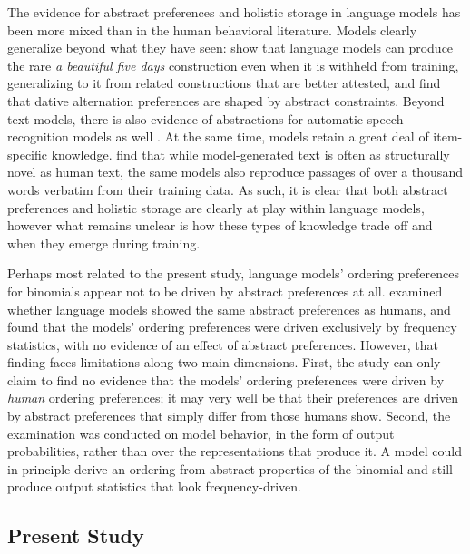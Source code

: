 \documentclass[11pt]{article}
\begin{document}
The evidence for abstract preferences and holistic storage in language
models has been more mixed than in the human behavioral literature.
Models clearly generalize beyond what they have seen:
\citet{misraLanguageModelsLearn2024} show that language models can
produce the rare \emph{a beautiful five days} construction even when it
is withheld from training, generalizing to it from related constructions
that are better attested, and \citet{yaoBothDirectIndirect2025} find
that dative alternation preferences are shaped by abstract constraints.
Beyond text models, there is also evidence of abstractions for automatic
speech recognition models as well \citep{pluth2026mechanistic}. At the
same time, models retain a great deal of item-specific knowledge.
\citet{mccoy2023howmuchlanguage} find that while model-generated text is
often as structurally novel as human text, the same models also
reproduce passages of over a thousand words verbatim from their training
data. As such, it is clear that both abstract preferences and holistic
storage are clearly at play within language models, however what remains
unclear is how these types of knowledge trade off and when they emerge
during training.

Perhaps most related to the present study, language models' ordering
preferences for binomials appear not to be driven by abstract
preferences at all. \citet{houghton2025role} examined whether language
models showed the same abstract preferences as humans, and found that
the models' ordering preferences were driven exclusively by frequency
statistics, with no evidence of an effect of abstract preferences.
However, that finding faces limitations along two main dimensions.
First, the study can only claim to find no evidence that the models'
ordering preferences were driven by \emph{human} ordering preferences;
it may very well be that their preferences are driven by abstract
preferences that simply differ from those humans show. Second, the
examination was conducted on model behavior, in the form of output
probabilities, rather than over the representations that produce it. A
model could in principle derive an ordering from abstract properties of
the binomial and still produce output statistics that look
frequency-driven.

\subsection{Present Study}\label{present-study}
\end{document}
